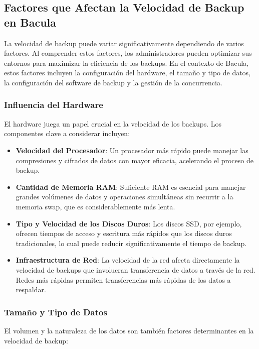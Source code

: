 \subsection{Factores que Afectan la Velocidad de Backup en Bacula}

La velocidad de backup puede variar significativamente dependiendo de varios factores. Al comprender estos factores, los administradores pueden optimizar sus entornos para maximizar la eficiencia de los backups. En el contexto de Bacula, estos factores incluyen la configuración del hardware, el tamaño y tipo de datos, la configuración del software de backup y la gestión de la concurrencia.

\subsubsection{Influencia del Hardware}

El hardware juega un papel crucial en la velocidad de los backups. Los componentes clave a considerar incluyen:

\begin{itemize}
    \item \textbf{Velocidad del Procesador}: Un procesador más rápido puede manejar las compresiones y cifrados de datos con mayor eficacia, acelerando el proceso de backup.
    \item \textbf{Cantidad de Memoria RAM}: Suficiente RAM es esencial para manejar grandes volúmenes de datos y operaciones simultáneas sin recurrir a la memoria swap, que es considerablemente más lenta.
    \item \textbf{Tipo y Velocidad de los Discos Duros}: Los discos SSD, por ejemplo, ofrecen tiempos de acceso y escritura más rápidos que los discos duros tradicionales, lo cual puede reducir significativamente el tiempo de backup.
    \item \textbf{Infraestructura de Red}: La velocidad de la red afecta directamente la velocidad de backups que involucran transferencia de datos a través de la red. Redes más rápidas permiten transferencias más rápidas de los datos a respaldar.
\end{itemize}

\subsubsection{Tamaño y Tipo de Datos}

El volumen y la naturaleza de los datos son también factores determinantes en la velocidad de backup:

